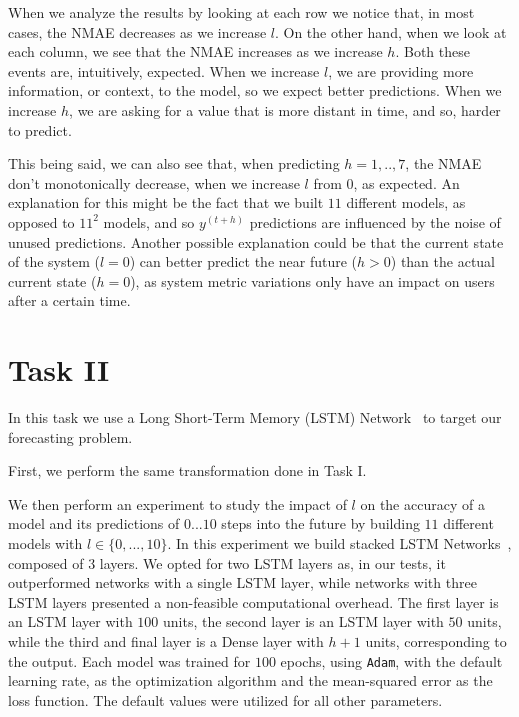 \documentclass[10pt]{article}
\begin{document}
When we analyze the results by looking at each row we notice that, in most cases, the \textsc{NMAE} decreases as we increase $l$. On the other hand, when we look at each column, we see that the \textsc{NMAE} increases as we increase $h$. Both these events are, intuitively, expected. When we increase $l$, we are providing more information, or context, to the model, so we expect better predictions. When we increase $h$, we are asking for a value that is more distant in time, and so, harder to predict.

This being said, we can also see that, when predicting $h = 1,..,7$, the \textsc{NMAE} don't monotonically decrease, when we increase $l$ from $0$, as expected. An explanation for this might be the fact that we built $11$ different models, as opposed to $11^2$ models, and so $y^{(t+h)}$ predictions are influenced by the noise of unused predictions. Another possible explanation could be that the current state of the system ($l=0$) can better predict the near future ($h>0$) than the actual current state ($h=0$), as system metric variations only have an impact on users after a certain time.

\section*{Task II}
\label{sec:4}

In this task we use a Long Short-Term Memory (LSTM) Network~\cite{LSTM} to target our forecasting problem.

First, we perform the same transformation done in Task I.

We then perform an experiment to study the impact of $l$ on the accuracy of a model and its predictions of $0...10$ steps into the future by building $11$ different models with $l\in\{0,...,10\}$. In this experiment we build stacked LSTM Networks~\cite{SLSTM}, composed of 3 layers. We opted for two LSTM layers as, in our tests, it outperformed networks with a single LSTM layer, while networks with three LSTM layers presented a non-feasible computational overhead. The first layer is an LSTM layer with $100$ units, the second layer is an LSTM layer with $50$ units, while the third and final layer is a Dense layer with $h+1$ units, corresponding to the output. Each model was trained for $100$ epochs, using \texttt{Adam}, with the default learning rate, as the optimization algorithm and the mean-squared error as the loss function. The default values were utilized for all other parameters.
\end{document}
